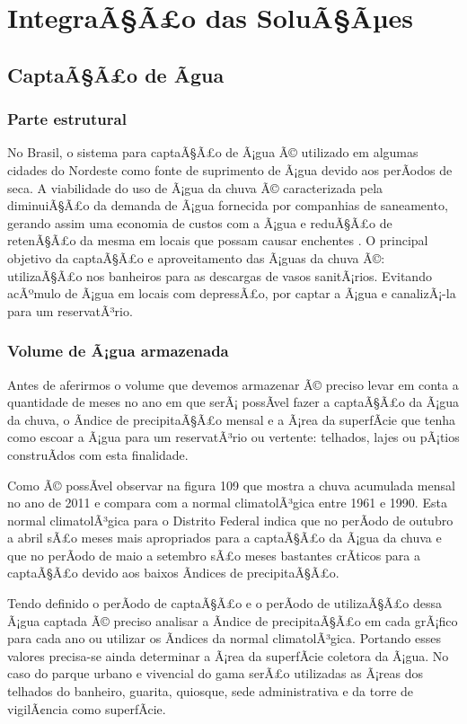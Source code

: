 \part{IntegraÃ§Ã£o das SoluÃ§Ãµes}

\chapter{CaptaÃ§Ã£o de Ãgua}

\section{Parte estrutural}

No Brasil, o sistema para captaÃ§Ã£o de Ã¡gua Ã© utilizado em algumas cidades do Nordeste como fonte de suprimento de Ã¡gua devido aos perÃ­odos de seca. A viabilidade do uso de Ã¡gua da chuva Ã© caracterizada pela diminuiÃ§Ã£o da demanda de Ã¡gua fornecida por companhias de saneamento, gerando assim uma economia de custos com a Ã¡gua e reduÃ§Ã£o de retenÃ§Ã£o da mesma em locais que possam causar enchentes \citep{MAY}.
O principal objetivo da captaÃ§Ã£o e aproveitamento das Ã¡guas da chuva Ã©: utilizaÃ§Ã£o nos banheiros para as descargas de vasos sanitÃ¡rios. Evitando acÃºmulo de Ã¡gua em locais com depressÃ£o, por captar a Ã¡gua e canalizÃ¡-la para um reservatÃ³rio.

\section{Volume de Ã¡gua armazenada}

Antes de aferirmos o volume que devemos armazenar Ã© preciso levar em conta a quantidade de meses no ano em que serÃ¡ possÃ­vel fazer a captaÃ§Ã£o da Ã¡gua da chuva, o Ã­ndice de precipitaÃ§Ã£o mensal e a Ã¡rea da superfÃ­cie que tenha como escoar a Ã¡gua para um reservatÃ³rio ou vertente: telhados, lajes ou pÃ¡tios construÃ­dos com esta finalidade. 

Como Ã© possÃ­vel observar na figura 109 que mostra a chuva acumulada mensal no ano de 2011 e compara com a normal climatolÃ³gica entre 1961 e 1990. Esta normal climatolÃ³gica para o Distrito Federal indica que no perÃ­odo de outubro a abril sÃ£o meses mais apropriados para a captaÃ§Ã£o da Ã¡gua da chuva e que no perÃ­odo de maio a setembro sÃ£o meses bastantes crÃ­ticos para a captaÃ§Ã£o devido aos baixos Ã­ndices de precipitaÃ§Ã£o. 

Tendo definido o perÃ­odo de captaÃ§Ã£o e o perÃ­odo de utilizaÃ§Ã£o dessa Ã¡gua captada Ã© preciso analisar a Ã­ndice de precipitaÃ§Ã£o em cada grÃ¡fico para cada ano ou utilizar os Ã­ndices da normal climatolÃ³gica. Portando esses valores precisa-se ainda determinar a Ã¡rea da superfÃ­cie coletora da Ã¡gua. No caso do parque urbano e vivencial do gama serÃ£o utilizadas as Ã¡reas dos telhados do banheiro, guarita, quiosque, sede administrativa e da torre de vigilÃ¢ncia como superfÃ­cie. 

